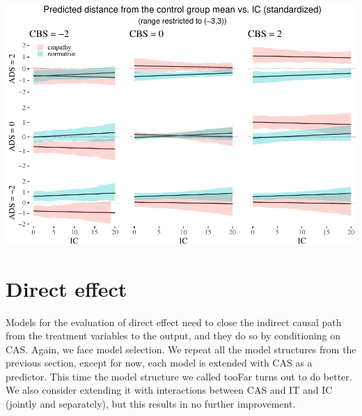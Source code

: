 \documentclass[
  10pt,
  dvipsnames,enabledeprecatedfontcommands]{scrartcl}
\begin{document}
\begin{center}\includegraphics[width=1\linewidth]{bayesianReport3_files/figure-latex/unnamed-chunk-15-1} \end{center}
\normalsize

\hypertarget{direct-effect}{%
\section{Direct effect}\label{direct-effect}}

Models for the evaluation of direct effect need to close the indirect
causal path from the treatment variables to the output, and they do so
by conditioning on \textsf{CAS}. Again, we face model selection. We
repeat all the model structures from the previous section, except for
now, each model is extended with \textsf{CAS} as a predictor. This time
the model structure we called \textsf{tooFar} turns out to do better. We
also consider extending it with interactions between \textsf{CAS} and
\textsf{IT} and \textsf{IC} (jointly and separately), but this results
in no further improvement.

\vspace{1mm}
\footnotesize
\end{document}
